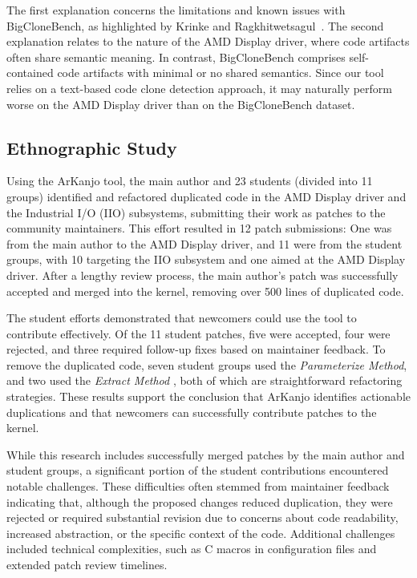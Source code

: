 \documentclass[conference]{IEEEtran}
\begin{document}
The first explanation concerns the limitations and known issues with BigCloneBench, as
highlighted by Krinke and Ragkhitwetsagul~\cite{bigfail}. The
second explanation relates to the nature of the AMD Display driver, where code artifacts
often share semantic meaning. In contrast, BigCloneBench comprises self-contained code
artifacts with minimal or no shared semantics. Since our tool relies on a text-based code clone
detection approach, it may naturally perform worse on the AMD Display driver than on the
BigCloneBench dataset.

\subsection{Ethnographic Study}

Using the ArKanjo tool, the main author and 23 students (divided into 11 groups) identified and refactored 
duplicated code in the AMD Display driver and the Industrial I/O (IIO) subsystems, submitting their work 
as patches to the community maintainers. This effort resulted in 12 patch submissions: 
One was from the main author to the AMD Display driver, and 11 were from the student groups, with 10 targeting 
the IIO subsystem and one aimed at the AMD Display driver. After a lengthy review process, the main author's patch 
was successfully accepted and merged into the kernel, removing over 500 lines of duplicated code.

The student efforts demonstrated that newcomers could use the tool to contribute effectively. 
Of the 11 student patches, five were accepted, four were rejected, and three required follow-up 
fixes based on maintainer feedback. To remove the duplicated code, seven student groups used the 
\textit{Parameterize Method}, and two used the \textit{Extract Method} \cite{refactorbook}, both of which are 
straightforward refactoring strategies. These results support the conclusion that ArKanjo identifies 
actionable duplications and that newcomers can successfully contribute patches to the kernel.

While this research includes successfully merged patches by the main author and student groups,
a significant portion of the student contributions encountered notable challenges. These difficulties 
often stemmed from maintainer feedback indicating that, although the proposed changes reduced duplication, 
they were rejected or required substantial revision due to concerns about code readability, increased abstraction, 
or the specific context of the code. Additional challenges included technical complexities, such as C macros in 
configuration files and extended patch review timelines. 
\end{document}
